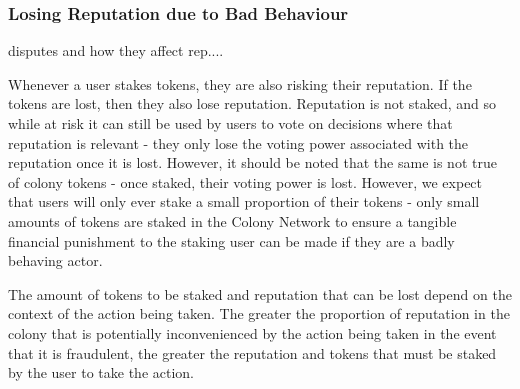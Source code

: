 \subsubsection{Losing Reputation due to Bad Behaviour}
disputes and how they affect rep....


Whenever a user stakes tokens, they are also risking their reputation. If the tokens are lost, then they also lose reputation. Reputation is not staked, and so while at risk it can still be used by users to vote on decisions where that reputation is relevant - they only lose the voting power associated with the reputation once it is lost. However, it should be noted that the same is not true of colony tokens - once staked, their voting power is lost. However, we expect that users will only ever stake a small proportion of their tokens - only small amounts of tokens are staked in the Colony Network to ensure a tangible financial punishment to the staking user can be made if they are a badly behaving actor.

The amount of tokens to be staked and reputation that can be lost depend on the context of the action being taken. The greater the proportion of reputation in the colony that is potentially inconvenienced by the action being taken in the event that it is fraudulent, the greater the reputation and tokens that must be staked by the user to take the action.




